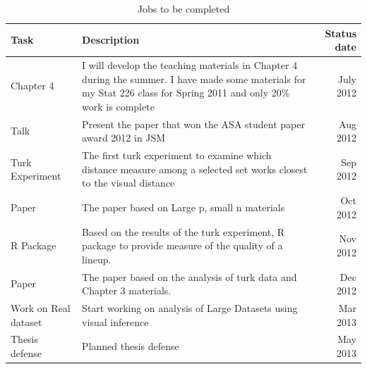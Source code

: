 \documentclass[12]{report}
\begin{document}
\begin{table}[hbtp]
\caption{Jobs to be completed}
\centering 
\begin{tabular}{|l|p{10cm}|r|} 
\hline
Task &  Description & Status date\\ %
\hline
Chapter 4 & I will develop the teaching materials in Chapter 4 during the summer. I have made some materials for my Stat 226 class for Spring 2011 and only 20\% work is complete\vspace{.1in} & July 2012 \\
Talk & Present the paper that won the ASA student paper award 2012 in JSM \vspace{.1in} & Aug 2012\\
Turk Experiment & The first turk experiment to examine which distance measure among a selected set works closest to the visual distance  \vspace{.1in}& Sep 2012 \\
Paper & The paper based on Large p, small n materials \vspace{.1in} & Oct 2012 \\
R Package  & Based on the results of the turk experiment, R package to provide measure of the quality of a lineup.  \vspace{.1in} & Nov 2012\\
Paper & The paper based on the analysis of turk data and Chapter 3 materials. \vspace{.1in} & Dec 2012\\
Work on Real dataset & Start working on analysis of Large Datasets using visual inference \vspace{.1in}  & Mar 2013\\ 
Thesis defense & Planned thesis defense \vspace{.1in} & May 2013\\
\hline 
\end{tabular}
\label{tbl:tjob}
\end{table}	
\end{document}
